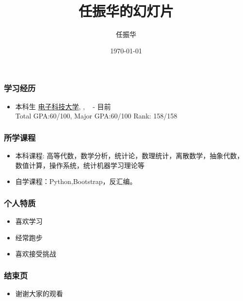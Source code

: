\documentclass{beamer}
\title{任振华的幻灯片}
\author{任振华}
\date{\today}
\begin{document}
\begin{frame}
    \titlepage
\end{frame}
\begin{frame}
\frametitle{学习经历}
\begin{itemize}
 \item 本科生 \qquad \underline{电子科技大学}, , \  - 目前
   \smallskip
             \newline \hphantom{本科生 \qquad }\\
              {\small Total GPA:60/100, \quad Major GPA:60/100 } \quad Rank: 158/158\\
 \bigskip
\end{itemize}
\end{frame}
\begin{frame}
\frametitle{所学课程}
\begin{itemize}
\item 本科课程: 高等代数，数学分析，统计论，数理统计，离散数学，抽象代数，数值计算，操作系统，统计机器学习理论等
\item 自学课程：Python,Bootstrap，反汇编。
\end{itemize}
\end{frame}
\begin{frame}
\frametitle{个人特质}
\begin{itemize}
\item 喜欢学习
\item 经常跑步
\item 喜欢接受挑战
\end{itemize}
\end{frame}
\begin{frame}
\frametitle{结束页}
\begin{itemize}
\item 谢谢大家的观看
\end{itemize}
\end{frame}
\end{document}
